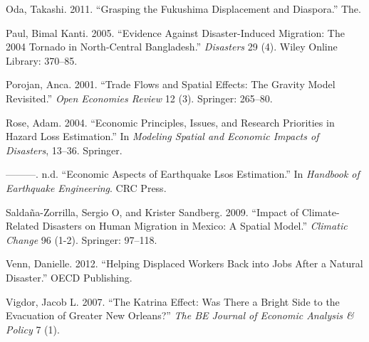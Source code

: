 \documentclass[]{article}
\begin{document}
\hypertarget{ref-oda2011grasping}{}
Oda, Takashi. 2011. ``Grasping the Fukushima Displacement and
Diaspora.'' The.

\hypertarget{ref-paul2005evidence}{}
Paul, Bimal Kanti. 2005. ``Evidence Against Disaster-Induced Migration:
The 2004 Tornado in North-Central Bangladesh.'' \emph{Disasters} 29 (4).
Wiley Online Library: 370--85.

\hypertarget{ref-porojan2001trade}{}
Porojan, Anca. 2001. ``Trade Flows and Spatial Effects: The Gravity
Model Revisited.'' \emph{Open Economies Review} 12 (3). Springer:
265--80.

\hypertarget{ref-rose2004economic}{}
Rose, Adam. 2004. ``Economic Principles, Issues, and Research Priorities
in Hazard Loss Estimation.'' In \emph{Modeling Spatial and Economic
Impacts of Disasters}, 13--36. Springer.

\hypertarget{ref-rose2016earthquake}{}
---------. n.d. ``Economic Aspects of Earthquake Lsos Estimation.'' In
\emph{Handbook of Earthquake Engineering}. CRC Press.

\hypertarget{ref-saldana2009impact}{}
Saldaña-Zorrilla, Sergio O, and Krister Sandberg. 2009. ``Impact of
Climate-Related Disasters on Human Migration in Mexico: A Spatial
Model.'' \emph{Climatic Change} 96 (1-2). Springer: 97--118.

\hypertarget{ref-venn2012helping}{}
Venn, Danielle. 2012. ``Helping Displaced Workers Back into Jobs After a
Natural Disaster.'' OECD Publishing.

\hypertarget{ref-vigdor2007katrina}{}
Vigdor, Jacob L. 2007. ``The Katrina Effect: Was There a Bright Side to
the Evacuation of Greater New Orleans?'' \emph{The BE Journal of
Economic Analysis \& Policy} 7 (1).
\end{document}
